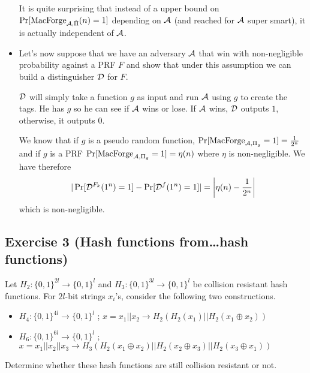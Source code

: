 \begin{solution}
\begin{itemize}
      It is quite surprising that instead of a upper bound
      on $\Pr[\operatorname{MacForge}_{\mathcal{A}, \tilde{\Pi}}(n) = 1]$
      depending on $\mathcal{A}$ (and reached for $\mathcal{A}$ super smart),
      it is actually independent of $\mathcal{A}$.
    \item
      Let's now suppose that we have an adversary $\mathcal{A}$
      that win with non-negligible probability against a PRF $F$
      and show that under this assumption we can build
      a distinguisher $\mathcal{D}$ for $F$.

      $\mathcal{D}$ will simply take a function $g$ as input
      and run $\mathcal{A}$ using $g$ to create the tags.
      He has $g$ so he can see if $\mathcal{A}$ wins or lose.
      If $\mathcal{A}$ wins, $\mathcal{D}$ outputs $1$, otherwise, it outputs $0$.

      We know that if $g$ is a pseudo random function,
      $\Pr[\operatorname{MacForge}_{\mathcal{A}, \Pi_g} = 1] = \frac{1}{2^n}$
      and if $g$ is a PRF
      $\Pr[\operatorname{MacForge}_{\mathcal{A}, \Pi_g} = 1] = \eta(n)$
      where $\eta$ is non-negligible.
      We have therefore
      \[
        |\Pr[\mathcal{D}^{F_k}(1^n) = 1] - \Pr[\mathcal{D}^{f}(1^n) = 1]|
        = \left|\eta(n) - \frac{1}{2^n}\right|
      \]
      which is non-negligible.

  \end{itemize}

\end{solution}

\subsection{Exercise 3 (Hash functions from\ldots hash functions)}
Let $H_2:\{0,1\}^{2l}\rightarrow\{0,1\}^{l}$ and $H_3:\{0,1\}^{3l}\rightarrow\{0,1\}^{l}$ be
collision resistant hash functions. For $2l$-bit strings $x_i$'s, consider the following two constructions.
\medskip
\begin{itemize}
	\item $H_4:\{0,1\}^{4l}\rightarrow\{0,1\}^{l}$ ; 
	      $x=x_1||x_2\rightarrow H_2\left(H_2(x_1)||H_2(x_1\oplus x_2)\right)$
	      \smallskip
	\item $H_6:\{0,1\}^{6l}\rightarrow\{0,1\}^{l}$ ; 
	      $x=x_1||x_2||x_3\rightarrow H_3\left(H_2(x_1\oplus x_2)||H_2(x_2\oplus x_3)||H_2(x_3\oplus x_1)\right)$
\end{itemize}
\medskip
Determine whether these hash functions are still collision resistant or not.

